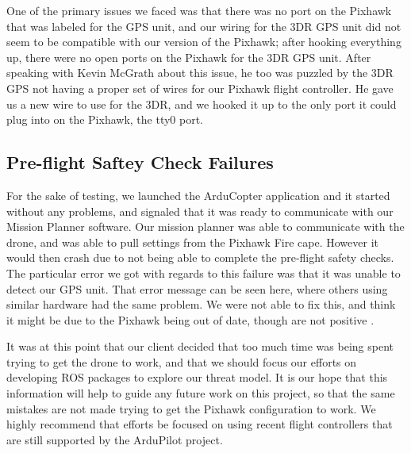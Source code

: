 \documentclass[IEEEtran,letterpaper,10pt,notitlepage,draftclsnofoot]{article}
\begin{document}
One of the primary issues we faced was that there was no port on the Pixhawk that was labeled for the GPS
unit, and our wiring for the 3DR GPS unit did not seem to be compatible with our version of the Pixhawk; after
hooking everything up, there were no open ports on the Pixhawk for the 3DR GPS unit.
After speaking with Kevin McGrath about this issue, he too was puzzled by the 3DR GPS not having a proper
set of wires for our Pixhawk flight controller. He gave us a new wire to use for the 3DR, and we hooked it
up to the only port it could plug into on the Pixhawk, the tty0 port.


\subsection{Pre-flight Saftey Check Failures}

For the sake of testing, we launched the ArduCopter application and it started without any problems, and
signaled that it was ready to communicate with our Mission Planner software. Our mission planner was able to
communicate with the drone, and was able to pull settings from the Pixhawk Fire cape. However it would then
crash due to not being able to complete the pre-flight safety checks. The particular error we got with
regards to this failure was that it was unable to detect our GPS unit. That error message can be seen here,
where others using similar hardware had the same problem. We were not able to fix this, and think it might
be due to the Pixhawk being out of date, though are not positive \cite{3DRError} \cite{3DRError2}. 

It was at this point that our client decided that too much time was being spent trying to get the drone to
work, and that we should focus our efforts on developing ROS packages to explore our threat model. It is our
hope that this information will help to guide any future work on this project, so that the same mistakes are
not made trying to get the Pixhawk configuration to work. We highly recommend that efforts be focused on using
recent flight controllers that are still supported by the ArduPilot project.
\end{document}
